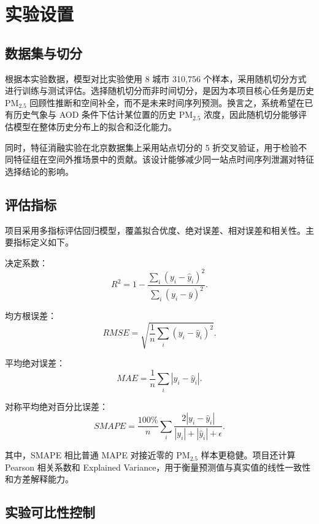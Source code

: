 ﻿\documentclass[UTF8,zihao=-4,a4paper]{ctexart}
\newcommand{\pmfine}{PM$_{2.5}$}
\newcommand{\aod}{AOD}
\begin{document}
\section{实验设置}

\subsection{数据集与切分}

根据本实验数据，模型对比实验使用 8 城市 310,756 个样本，采用随机切分方式进行训练与测试评估。选择随机切分而非时间切分，是因为本项目核心任务是历史 \pmfine{} 回顾性推断和空间补全，而不是未来时间序列预测。换言之，系统希望在已有历史气象与 \aod{} 条件下估计某位置的历史 \pmfine{} 浓度，因此随机切分能够评估模型在整体历史分布上的拟合和泛化能力。

同时，特征消融实验在北京数据集上采用站点切分的 5 折交叉验证，用于检验不同特征组在空间外推场景中的贡献。该设计能够减少同一站点时间序列泄漏对特征选择结论的影响。

\subsection{评估指标}

项目采用多指标评估回归模型，覆盖拟合优度、绝对误差、相对误差和相关性。主要指标定义如下。

决定系数：
\begin{equation}
  R^2 = 1 - \frac{\sum_i (y_i-\hat{y}_i)^2}{\sum_i (y_i-\bar{y})^2}.
  \label{eq:r2}
\end{equation}

均方根误差：
\begin{equation}
  RMSE = \sqrt{\frac{1}{n}\sum_i (y_i-\hat{y}_i)^2}.
  \label{eq:rmse}
\end{equation}

平均绝对误差：
\begin{equation}
  MAE = \frac{1}{n}\sum_i |y_i-\hat{y}_i|.
  \label{eq:mae}
\end{equation}

对称平均绝对百分比误差：
\begin{equation}
  SMAPE = \frac{100\%}{n}\sum_i \frac{2|y_i-\hat{y}_i|}{|y_i|+|\hat{y}_i|+\epsilon}.
  \label{eq:smape}
\end{equation}

其中，SMAPE 相比普通 MAPE 对接近零的 \pmfine{} 样本更稳健。项目还计算 Pearson 相关系数和 Explained Variance，用于衡量预测值与真实值的线性一致性和方差解释能力。

\subsection{实验可比性控制}
\end{document}
